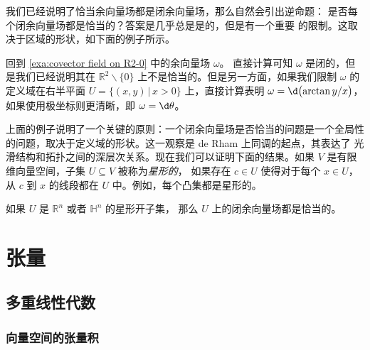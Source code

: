\documentclass[fontset=none]{Notes}
\begin{document}
我们已经说明了恰当余向量场都是闭余向量场，那么自然会引出逆命题：
是否每个闭余向量场都是恰当的？答案是几乎总是是的，但是有一个重要
的限制。这取决于区域的形状，如下面的例子所示。

\begin{example}
  回到 \autoref{exa:covector field on R2-0} 中的余向量场 $\omega$。
  直接计算可知 $\omega$ 是闭的，但是我们已经说明其在 $\mathbb{R}^2 \smallsetminus\{0\}$
  上不是恰当的。但是另一方面，如果我们限制 $\omega$ 的定义域在右半平面
  $U=\{(x,y)\,|\, x>0\}$ 上，直接计算表明 $\omega=\d\bigl(\arctan y/x\bigr)$，
  如果使用极坐标则更清晰，即 $\omega=\d\theta$。
\end{example}

上面的例子说明了一个关键的原则：一个闭余向量场是否恰当的问题是一个全局性
的问题，取决于定义域的形状。这一观察是 de Rham 上同调的起点，其表达了
光滑结构和拓扑之间的深层次关系。现在我们可以证明下面的结果。如果
$V$ 是有限维向量空间，子集 $U\subseteq V$ 被称为\emph{星形的}，
如果存在 $c\in U$ 使得对于每个 $x\in U$，从 $c$ 到 $x$ 的线段都在
$U$ 中。例如，每个凸集都是星形的。

\begin{theorem}
  如果 $U$ 是 $\mathbb{R}^n$ 或者 $\mathbb{H}^n$ 的星形开子集，
  那么 $U$ 上的闭余向量场都是恰当的。
\end{theorem}






\chapter{张量}

\section{多重线性代数}

\subsection{向量空间的张量积}
\end{document}

